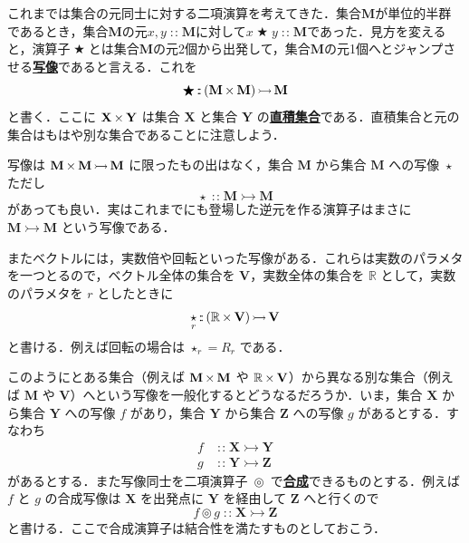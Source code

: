 \documentclass[a4paper,twocolumn]{jsbook}
\newcommand{\keyword}[1]{{\underline{\textbf{#1}}}}
\DeclareMathOperator{\mBinOp}{\bigstar}
\DeclareMathOperator{\mCompProj}{\circledcirc}
\DeclareMathOperator{\mIn}{{:\!:}}
\DeclareMathOperator{\mMorphTo}{\rightarrowtail}
\DeclareMathOperator{\mSetTimes}{\boldmath{\times}}
\DeclareMathOperator{\mUnOp}{\star}
\newcommand{\mSet}[1]{\mathbf{#1}}
\newcommand{\mSpecialSet}[1]{\mathbb{#1}} %
\newcommand{\mRSet}{\mSpecialSet{R}}
\newcommand{\mMorph}[2]{#1\mMorphTo#2}
\begin{document}
これまでは集合の元同士に対する二項演算を考えてきた．集合$\mSet{M}$が単位的半群であるとき，集合$\mSet{M}$の元$x,y\mIn\mSet{M}$に対して$x\mBinOp y\mIn\mSet{M}$であった．見方を変えると，演算子$\mBinOp$とは集合$\mSet{M}$の元2個から出発して，集合$\mSet{M}$の元1個へとジャンプさせる\keyword{写像}であると言える．これを
\begin{equation}
\mBinOp\mIn{}\mMorph{(\mSet{M}\mSetTimes\mSet{M})}{\mSet{M}}
\end{equation}
と書く．ここに $\mSet{X}\mSetTimes\mSet{Y}$ は集合 $\mSet{X}$ と集合 $\mSet{Y}$ の\keyword{直積集合}である．直積集合と元の集合はもはや別な集合であることに注意しよう．

写像は $\mMorph{\mSet{M}\mSetTimes\mSet{M}}{\mSet{M}}$ に限ったもの出はなく，集合 $\mSet{M}$ から集合 $\mSet{M}$ への写像 $\mUnOp$ ただし
\begin{equation}
\mUnOp\mIn\mMorph{\mSet{M}}{\mSet{M}}
\end{equation}
があっても良い．実はこれまでにも登場した逆元を作る演算子はまさに $\mMorph{\mSet{M}}{\mSet{M}}$ という写像である．

またベクトルには，実数倍や回転といった写像がある．これらは実数のパラメタを一つとるので，ベクトル全体の集合を $\mSet{V}$，実数全体の集合を $\mRSet$ として，実数のパラメタを $r$ としたときに
\begin{equation}
\mUnOp_r\mIn{}\mMorph{(\mRSet\mSetTimes\mSet{V})}{\mSet{V}}
\end{equation}
と書ける．例えば回転の場合は $\mUnOp_r=R_r$ である．

このようにとある集合（例えば $\mSet{M}\mSetTimes\mSet{M}$ や $\mRSet\mSetTimes\mSet{V}$）から異なる別な集合（例えば $\mSet{M}$ や $\mSet{V}$）へという写像を一般化するとどうなるだろうか．いま，集合 $\mSet{X}$ から集合 $\mSet{Y}$ への写像 $f$ があり，集合 $\mSet{Y}$ から集合 $\mSet{Z}$ への写像 $g$ があるとする．すなわち
\begin{align}
f&\mIn\mMorph{\mSet{X}}{\mSet{Y}}\\
g&\mIn\mMorph{\mSet{Y}}{\mSet{Z}}
\end{align}
があるとする．また写像同士を二項演算子 $\mCompProj$ で\keyword{合成}できるものとする．例えば $f$ と $g$ の合成写像は $\mSet{X}$ を出発点に $\mSet{Y}$ を経由して $\mSet{Z}$ へと行くので
\begin{equation}
f\mCompProj g\mIn\mMorph{\mSet{X}}{\mSet{Z}}
\end{equation}
と書ける．ここで合成演算子は結合性を満たすものとしておこう．
\end{document}
